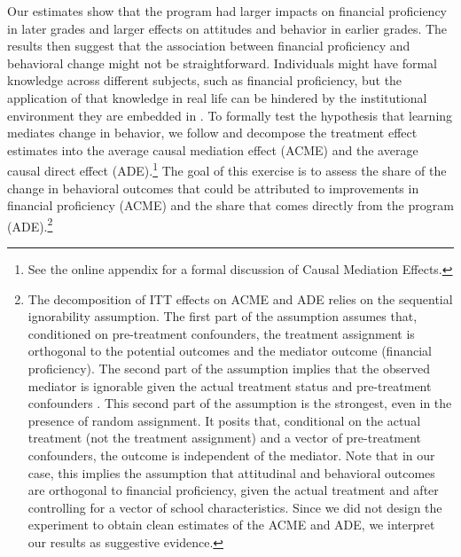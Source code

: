 Our estimates show that the program had larger impacts on financial proficiency in later grades and larger effects on attitudes and behavior in earlier grades. The results then suggest that the association between financial proficiency and behavioral change might not be straightforward. Individuals might have formal knowledge across different subjects, such as financial proficiency, but the application of that knowledge in real life can be hindered by the institutional environment they are embedded in \citep{carpena2020causal}. To formally test the hypothesis that learning mediates change in behavior, we follow \cite{imai2011unpacking} and
decompose the treatment effect estimates into the average causal mediation effect (ACME) and
the average causal direct effect (ADE).\footnote {See the online appendix for a formal discussion of Causal Mediation Effects.} The goal of this exercise is to assess the share of the change in behavioral outcomes that could be attributed to improvements in financial proficiency (ACME) and the share that comes directly from the program (ADE).\footnote{The decomposition of ITT effects on ACME and ADE relies on the sequential ignorability assumption. The first part of the assumption assumes that, conditioned on pre-treatment confounders, the treatment assignment is orthogonal to the potential outcomes and the mediator outcome (financial proficiency). The second part of the assumption implies that the observed mediator is ignorable given the actual treatment status and pre-treatment confounders \citep{imai2011unpacking}. This second part of the assumption is the strongest, even in the presence of random assignment. It posits that, conditional on the actual treatment (not the treatment assignment) and a vector of pre-treatment confounders, the outcome is independent of the mediator. Note that in our case, this implies the assumption that attitudinal and behavioral outcomes are orthogonal to financial proficiency, given the actual treatment and after controlling for a vector of school characteristics. Since we did not design the experiment to obtain clean estimates of the ACME and ADE, we interpret our results as suggestive evidence.}

